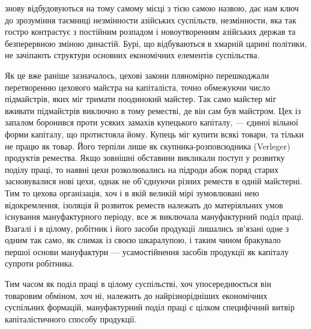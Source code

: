 знову відбудовуються на тому самому місці з тією самою назвою,
дає нам ключ до зрозуміння таємниці незмінности азійських
суспільств, незмінности, яка так гостро контрастує з постійним
розпадом і новоутворенням азійських держав та безперервною
зміною династій. Бурі, що відбуваються в хмарній царині політики,
не зачіпають структури основних економічних елементів
суспільства.

Як це вже раніше зазначалось, цехові закони пляномірно
перешкоджали перетворенню цехового майстра на капіталіста,
точно обмежуючи число підмайстрів, яких міг тримати поодинокий
майстер. Так само майстер міг вживати підмайстрів виключно
в тому реместві, де він сам був майстром. Цех із запалом
боронився проти усяких замахів купецького капіталу, —
єдиної вільної форми капіталу, що протистояла йому. Купець
міг купити всякі товари, та тільки не працю як товар. Його терпіли
лише як скупника-розповсюдника (Verleger) продуктів
ремества. Якщо зовнішні обставини викликали поступ у розвитку
поділу праці, то наявні цехи розколювались на підроди абож
поряд старих засновувалися нові цехи, однак не об’єднуючи різних
реместв в одній майстерні. Тим то цехова організація, хоч і в
якій великій мірі зумовлювані нею відокремлення, ізоляція й
розвиток реместв належать до матеріяльних умов існування
мануфактурного періоду, все ж виключала мануфактурний поділ
праці. Взагалі і в цілому, робітник і його засоби продукції
лишались зв’язані одне з одним так само, як слимак із своєю
шкаралупою, і таким чином бракувало першої основи мануфактури
— усамостійнення засобів продукції як капіталу супроти
робітника.

Тим часом як поділ праці в цілому суспільстві, хоч упосереднюється
він товаровим обміном, хоч ні, належить до найрізнорідніших
економічних суспільних формацій, мануфактурний
поділ праці є цілком специфічний витвір капіталістичного способу
продукції.
